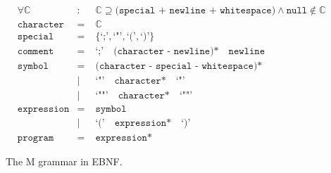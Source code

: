 \documentclass{article}
\begin{document}
    \begin{figure}[h]
        \centering
        \begin{align*}
            &\forall\mathbb{C}  &:&\;\mathbb{C}\supseteq\texttt{(special + newline + whitespace)}\land\texttt{null}\notin\mathbb{C}\\
            &\texttt{character} &=&\;\mathbb{C}\\
            &\texttt{special}   &=&\;\{\texttt{`;'},\texttt{`"'},\texttt{`('},\texttt{`)'}\}\\
            &\texttt{comment}   &=&\;\texttt{`;'}\quad\texttt{(character - newline)*}\quad\texttt{newline}\\
            &\texttt{symbol}    &=&\;\texttt{(character - special - whitespace)*}\\
            &                   &|&\;\texttt{`"'}\quad\texttt{character*}\quad\texttt{`"'}\\
            &                   &|&\;\texttt{`""'}\quad\texttt{character*}\quad\texttt{`""'}\\
            &\texttt{expression}&=&\;\texttt{symbol}\\
            &                   &|&\;\texttt{`('}\quad\texttt{expression*}\quad\texttt{`)'}\\
            &\texttt{program}   &=&\;\texttt{expression*}
        \end{align*}
        \caption{The M grammar in EBNF.}
    \end{figure}
\end{document}
